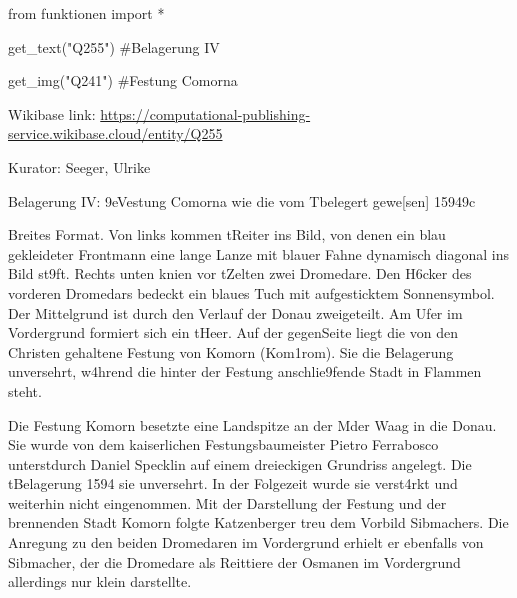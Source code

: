 \documentclass[
  a4paper,
  portrait]{book}
\newenvironment{Shaded}{\begin{snugshade}}{\end{snugshade}}
\newcommand{\CommentTok}[1]{\textcolor[rgb]{0.37,0.37,0.37}{#1}}
\newcommand{\ImportTok}[1]{\textcolor[rgb]{0.00,0.46,0.62}{#1}}
\newcommand{\NormalTok}[1]{\textcolor[rgb]{0.00,0.23,0.31}{#1}}
\newcommand{\OperatorTok}[1]{\textcolor[rgb]{0.37,0.37,0.37}{#1}}
\newcommand{\StringTok}[1]{\textcolor[rgb]{0.13,0.47,0.30}{#1}}
\begin{document}
\begin{Shaded}
\begin{Highlighting}[]
\ImportTok{from}\NormalTok{ funktionen }\ImportTok{import} \OperatorTok{*}
\end{Highlighting}
\end{Shaded}

\begin{Shaded}
\begin{Highlighting}[]
\NormalTok{get\_text(}\StringTok{"Q255"}\NormalTok{)}
\CommentTok{\#Belagerung IV}

\NormalTok{get\_img(}\StringTok{"Q241"}\NormalTok{)}
\CommentTok{\#Festung Comorna}
\end{Highlighting}
\end{Shaded}

Wikibase link:
\url{https://computational-publishing-service.wikibase.cloud/entity/Q255}

Kurator: Seeger, Ulrike

Belagerung IV: \x9eVestung Comorna wie die vom
T\xbcrckn belegert gewe{[}sen{]} 1594\x9c

Breites Format. Von links kommen t\xbcrkische Reiter ins Bild, von
denen ein blau gekleideter Frontmann eine lange Lanze mit blauer Fahne
dynamisch diagonal ins Bild st\x9ft. Rechts unten knien vor
t\xbcrkischen Zelten zwei Dromedare. Den H\xb6cker des vorderen
Dromedars bedeckt ein blaues Tuch mit aufgesticktem Sonnensymbol. Der
Mittelgrund ist durch den Verlauf der Donau zweigeteilt. Am Ufer im
Vordergrund formiert sich ein t\xbcrkisches Heer. Auf der
gegen\xbcberliegenden Seite liegt die von den Christen gehaltene
Festung von Komorn (Kom\xa1rom). Sie \xbcberstand die Belagerung
unversehrt, w\xa4hrend die hinter der Festung anschlie\x9fende
Stadt in Flammen steht.

Die Festung Komorn besetzte eine Landspitze an der M\xbcndung der
Waag in die Donau. Sie wurde von dem kaiserlichen Festungsbaumeister
Pietro Ferrabosco unterst\xbctzt durch Daniel Specklin auf einem
dreieckigen Grundriss angelegt. Die t\xbcrkische Belagerung 1594
\xbcberstand sie unversehrt. In der Folgezeit wurde sie
verst\xa4rkt und weiterhin nicht eingenommen. Mit der Darstellung
der Festung und der brennenden Stadt Komorn folgte Katzenberger treu dem
Vorbild Sibmachers. Die Anregung zu den beiden Dromedaren im Vordergrund
erhielt er ebenfalls von Sibmacher, der die Dromedare als Reittiere der
Osmanen im Vordergrund allerdings nur klein darstellte.
\end{document}
